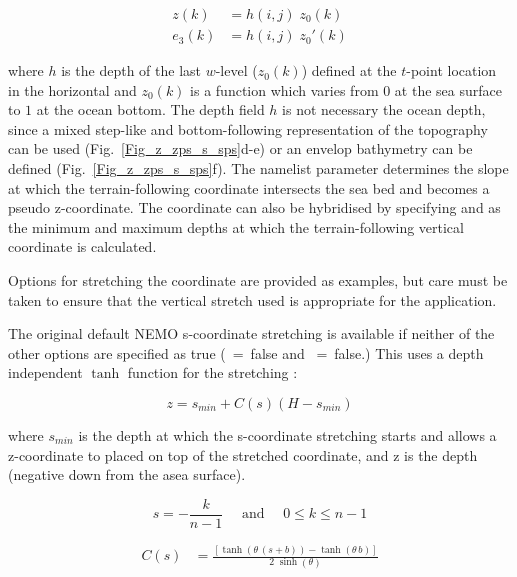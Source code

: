 \documentclass[NEMO_book]{subfiles}
\begin{document}
\begin{equation} \label{DOM_sco_ana}
\begin{split}
 z(k) 		&= h(i,j) \; z_0(k)	\\
 e_3(k)	&= h(i,j) \; z_0'(k)
\end{split}
\end{equation}

where $h$ is the depth of the last $w$-level ($z_0(k)$) defined at the $t$-point 
location in the horizontal and $z_0(k)$ is a function which varies from $0$ at the sea 
surface to $1$ at the ocean bottom. The depth field $h$ is not necessary the ocean 
depth, since a mixed step-like and bottom-following representation of the 
topography can be used (Fig.~\ref{Fig_z_zps_s_sps}d-e) or an envelop bathymetry can be defined (Fig.~\ref{Fig_z_zps_s_sps}f).
The namelist parameter  determines the slope at which the terrain-following coordinate intersects the sea bed and becomes a pseudo z-coordinate. The coordinate can also be hybridised by specifying  and  as the minimum and maximum depths at which the terrain-following vertical coordinate is calculated.

Options for stretching the coordinate are provided as examples, but care must be taken to ensure that the vertical stretch used is appropriate for the application.

The original default NEMO s-coordinate stretching is available if neither of the other options are specified as true (~=~false and ~=~false.) This uses a depth independent $\tanh$ function for the stretching \citep{Madec_al_JPO96}:

\begin{equation}
  z = s_{min}+C\left(s\right)\left(H-s_{min}\right)
  \label{eq:SH94_1}
\end{equation}

where $s_{min}$ is the depth at which the s-coordinate stretching starts and allows a z-coordinate to placed on top of the stretched coordinate, and z is the depth (negative down from the asea surface).

\begin{equation}
  s = -\frac{k}{n-1} \quad \text{ and } \quad 0 \leq k \leq n-1
  \label{eq:s}
\end{equation}

\begin{equation} \label{DOM_sco_function}
\begin{split}
C(s)	&=  \frac{ \left[	  \tanh{ \left( \theta \, (s+b) \right)} 
	  	 			- \tanh{ \left(  \theta \, b      \right)}  \right]}
		      {2\;\sinh \left( \theta \right)}
\end{split}
\end{equation}
\end{document}
